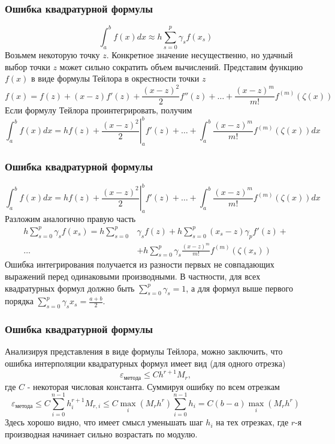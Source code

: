 \documentclass[aspectratio=169,unicode]{beamer}
\begin{document}
\begin{frame}
\frametitle{Ошибка квадратурной формулы}
	\[
	\int_a^b f(x) dx \approx h \sum_{s=0}^p \gamma_s f(x_s)
	\]
	Возьмем некоторую точку $z$. Конкретное значение несущественно, но удачный выбор точки $z$ может сильно сократить объем
	вычислений. \pause Представим функцию $f(x)$ в виде формулы Тейлора в окрестности точки $z$
	\[
	f(x) = f(z) + (x-z)f'(z) + \frac{(x-z)^2}{2}f''(z) + \dots + \frac{(x-z)^{m}}{m!}f^{(m)}(\zeta(x))
	\]
	Если формулу Тейлора проинтегрировать, получим
	\[
	\int_a^b f(x) dx = h f(z) + \left.\frac{(x-z)^2}{2}\right|_a^b f'(z) + \dots + \int_a^b \frac{(x-z)^{m}}{m!}f^{(m)}(\zeta(x)) dx
	\]
\end{frame}

\begin{frame}
\frametitle{Ошибка квадратурной формулы}
	\[
	\int_a^b f(x) dx = h f(z) + \left.\frac{(x-z)^2}{2}\right|_a^b f'(z) + \dots + \int_a^b \frac{(x-z)^{m}}{m!}f^{(m)}(\zeta(x)) dx
	\]
	Разложим аналогично правую часть
	\begin{align*}
		h \sum_{s=0}^p \gamma_s f(x_s) = h \sum_{s=0}^p &\gamma_s f(z) + h \sum_{s=0}^p (x_s-z)\gamma_p f'(z) + \\
	\dots&+ h \sum_{s=0}^p \gamma_s \frac{(x-z)^{m}}{m!} f^{(m)}(\zeta(x_s))
	\end{align*}
	Ошибка интегрирования получается из разности первых не совпадающих выражений перед одинаковыми производными. В частности, для всех
	квадратурных формул должно быть $\sum_{s=0}^p \gamma_s = 1$, а для формул выше первого порядка $\sum_{s=0}^p \gamma_s x_s = \frac{a+b}{2}$.
\end{frame}

\begin{frame}
\frametitle{Ошибка квадратурной формулы}
	Анализируя представления в виде формулы Тейлора, можно заключить, что
	ошибка интерполяции квадратурных формул имеет вид (для одного отрезка)
	\[
	\varepsilon_{\text{метода}} \leq C h^{r+1} M_r,
	\]
	где $C$ - некоторая числовая константа.
	Суммируя ошибку по всем отрезкам
	\[
	\varepsilon_{\text{метода}} \leq C \sum_{i=0}^{n-1} h_i^{r+1} M_{r,i} \leq C \max_i \left(M_r h^r\right)
	\sum_{i=0}^{n-1} h_i = C(b-a)\max_i \left(M_r h^r\right)
	\]
	Здесь хорошо видно, что имеет смысл уменьшать шаг $h_i$ на тех отрезках, где $r$-я производная начинает
	сильно возрастать по модулю.
\end{frame}
\end{document}

